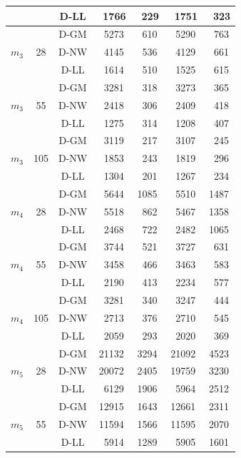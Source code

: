 \begin{table}[htbp]
{\begin{tabular}{ccccccc}
   &    & D-LL & ~1766 & ~229 & ~1751 & ~323 \\
\toprule
\multirow{3}{*}{$m_3$} & \multirow{3}{*}{28}
   & D-GM & ~5273 & ~610 & ~5290 & ~763 \\
   &    & D-NW & ~4145 & ~536 & ~4129 & ~661 \\
   &    & D-LL & ~1614 & ~510 & ~1525 & ~615 \\
\midrule
\multirow{3}{*}{$m_3$} & \multirow{3}{*}{55}
   & D-GM & ~3281 & ~318 & ~3273 & ~365 \\
   &    & D-NW & ~2418 & ~306 & ~2409 & ~418 \\
   &    & D-LL & ~1275 & ~314 & ~1208 & ~407 \\
\midrule
\multirow{3}{*}{$m_3$} & \multirow{3}{*}{105}
   & D-GM & ~3119 & ~217 & ~3107 & ~245 \\
   &    & D-NW & ~1853 & ~243 & ~1819 & ~296 \\
   &    & D-LL & ~1304 & ~201 & ~1267 & ~234 \\
\toprule
\multirow{3}{*}{$m_4$} & \multirow{3}{*}{28}
   & D-GM & ~5644 & 1085 & ~5510 & 1487 \\
   &    & D-NW & ~5518 & ~862 & ~5467 & 1358 \\
   &    & D-LL & ~2468 & ~722 & ~2482 & 1065 \\
\midrule
\multirow{3}{*}{$m_4$} & \multirow{3}{*}{55}
   & D-GM & ~3744 & ~521 & ~3727 & ~631 \\
   &    & D-NW & ~3458 & ~466 & ~3463 & ~583 \\
   &    & D-LL & ~2190 & ~413 & ~2234 & ~577 \\
\midrule
\multirow{3}{*}{$m_4$} & \multirow{3}{*}{105}
   & D-GM & ~3281 & ~340 & ~3247 & ~444 \\
   &    & D-NW & ~2713 & ~376 & ~2710 & ~545 \\
   &    & D-LL & ~2059 & ~293 & ~2020 & ~369 \\
\toprule
\multirow{3}{*}{$m_5$} & \multirow{3}{*}{28}
   & D-GM & 21132 & 3294 & 21092 & 4523 \\
   &    & D-NW & 20072 & 2405 & 19759 & 3230 \\
   &    & D-LL & ~6129 & 1906 & ~5964 & 2512 \\
\midrule
\multirow{3}{*}{$m_5$} & \multirow{3}{*}{55}
   & D-GM & 12915 & 1643 & 12661 & 2311 \\
   &    & D-NW & 11594 & 1566 & 11595 & 2070 \\
   &    & D-LL & ~5914 & 1289 & ~5905 & 1601 \\
\midrule

\end{tabular}}
\end{table}
